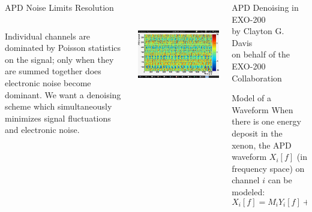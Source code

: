 \documentclass[final]{beamer} %
\begin{document}
\begin{frame}{}
\begin{columns}[t]
\begin{column}{.3\linewidth}
\begin{block}{APD Noise Limits Resolution}
\begin{columns}
\begin{column}{0.49\linewidth}
Individual channels are dominated by Poisson statistics on the signal; only when they are summed together does electronic noise become dominant.  We want a denoising scheme which simultaneously minimizes signal fluctuations and electronic noise.
         \end{column}
        \begin{column}{0.49\linewidth}
          \includegraphics[keepaspectratio=true,width=\textwidth,clip=true,trim=0mm 12mm 0mm 10mm]{Run4705Ev2_noiseEventDisplay.png}
        \end{column}
      \end{columns}

    \end{block}

  \end{column}


  \begin{column}{.3\linewidth}

    \begin{block}{\Huge \center APD Denoising in EXO-200 \\[\baselineskip]
                  \large by Clayton G. Davis \\
                  on behalf of the EXO-200 Collaboration}
    \end{block}

    \begin{block}{\large Model of a Waveform}
When there is one energy deposit in the xenon, the APD waveform $X_i[f]$ (in frequency space) on channel $i$ can be modeled:
\[X_i[f] = M_i Y_i[f] + N_i[f]\text{, where:}\]\\[-0.5\baselineskip]


\end{block}
\end{column}
\end{columns}
\end{frame}
\end{document}
